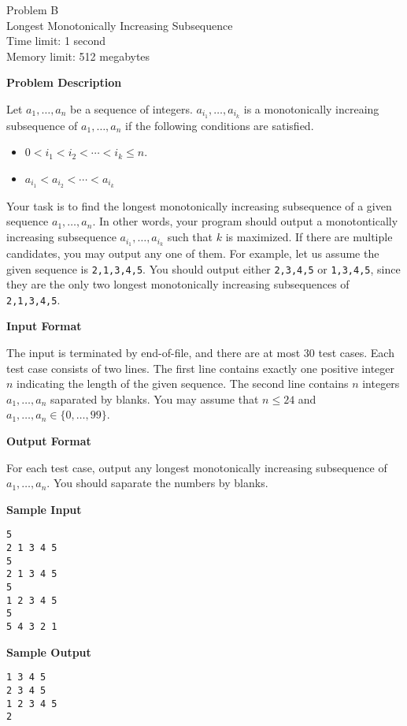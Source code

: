 \documentclass[11pt]{article}
\begin{document}
\begin{center}
    {\LARGE Problem B}\\
    {\Large Longest Monotonically Increasing Subsequence}\\
    {Time limit: 1 second}\\
    {Memory limit: 512 megabytes}
\end{center}

\textbf{\large Problem Description}

Let $a_1,\dots,a_n$ be a sequence of integers.
$a_{i_1},\dots,a_{i_k}$ is a monotonically increaing subsequence of 
$a_1,\dots,a_n$ if the following conditions are satisfied.
\begin{itemize}
\item $0<i_1<i_2<\cdots<i_k\le n$.
\item $a_{i_1}<a_{i_2}<\cdots<a_{i_k}$
\end{itemize}
Your task is to find the longest monotonically increasing subsequence of
a given sequence $a_1,\dots,a_n$. In other words, your program should output 
a monotontically increasing subsequence $a_{i_1},\dots,a_{i_k}$ such that $k$ 
is maximized. If there are multiple candidates, you may output any one of them.
For example, let us assume the given sequence is 
\verb+2,1,3,4,5+. You should output either \verb+2,3,4,5+ or \verb+1,3,4,5+,
since they are the only two longest monotonically increasing subsequences
of \verb+2,1,3,4,5+.

\textbf{\large Input Format}

The input is terminated by end-of-file, and there are at most 30 test cases.
Each test case consists of two lines. The first line contains exactly one 
positive integer $n$ indicating the length of the given sequence. The second 
line contains $n$ integers $a_1,\dots,a_n$ saparated by blanks.
You may assume that $n \le 24$ and $a_1,\dots,a_n\in\{0,\dots,99\}$.

\textbf{\large Output Format}

For each test case, output any longest monotonically increasing subsequence
of $a_1,\dots,a_n$. You should saparate the numbers by blanks.

\textbf{\large Sample Input}

\begin{verbatim}
5
2 1 3 4 5
5
2 1 3 4 5
5
1 2 3 4 5
5
5 4 3 2 1
\end{verbatim}

\textbf{\large Sample Output}
\begin{verbatim}
1 3 4 5
2 3 4 5
1 2 3 4 5
2
\end{verbatim}
\end{document}
